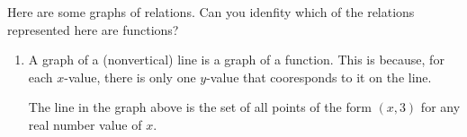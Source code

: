 \documentclass{ximera}
\begin{document}
\begin{example}
Here are some graphs of relations.  Can you idenfity which of the relations represented here are functions?

	\begin{image}

\hspace{15px}

	
\end{image}


\begin{explanation}
\begin{enumerate}[label=\alph*.]
\item
A graph of a (nonvertical) line is a graph of a function.  This is because, for each $x$-value, there is only one $y$-value that cooresponds to it on the line.

\begin{image}
\end{image}

The line in the graph above is the set of all points of the form $(x,3)$ for any real number value of $x$.  


\end{enumerate}
\end{explanation}
\end{example}
\end{document}
